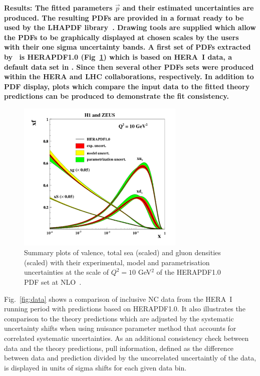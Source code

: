 \begin{description}
%
%
\item
\bf{Results:} \rm  The fitted parameters $\vec{p}$ and their estimated uncertainties are produced. 
The resulting PDFs are provided in a format ready to be used by the LHAPDF 
library~\cite{lhapdf,lhapdfweb}.
Drawing tools are supplied which allow the PDFs to be
graphically  displayed at chosen scales by the users with their one sigma uncertainty bands. 
A first set of PDFs extracted by \fitter~is HERAPDF1.0 \cite{h1zeus:2009wt} (Fig~\ref{fig:hera1}) 
which is based on HERA~I data, a default data set in \fitter. 
Since then several other PDFs sets were produced within the HERA and LHC collaborations, respectively.
In addition to PDF display, plots which compare the input data to the fitted theory predictions can be produced 
to demonstrate the fit consistency. 
\begin{figure}[!ht]
   \centering
   \includegraphics[width=8cm]{hera1.pdf}
   \caption{Summary plots of valence, total sea (scaled) and gluon densities (scaled) with their experimental, model and parametrisation uncertainties at the scale of $Q^2=10$ GeV$^2$ of the HERAPDF1.0 PDF set at NLO~\cite{h1zeus:2009wt}.}
 \label{fig:hera1}
\end{figure}
Fig.~\ref{fig:data} shows a comparison of inclusive NC data from the HERA~I running period with predictions based on HERAPDF1.0. It also illustrates the comparison to the theory predictions which are adjusted by the  
systematic uncertainty shifts when using nuisance parameter method that accounts for 
correlated systematic uncertainties. 
As an additional consistency check between data and the theory predictions, pull information, defined as the difference between data and prediction divided by the uncorrelated uncertaintly of the data, is displayed in units of sigma shifts for each given data bin.


\end{description}
